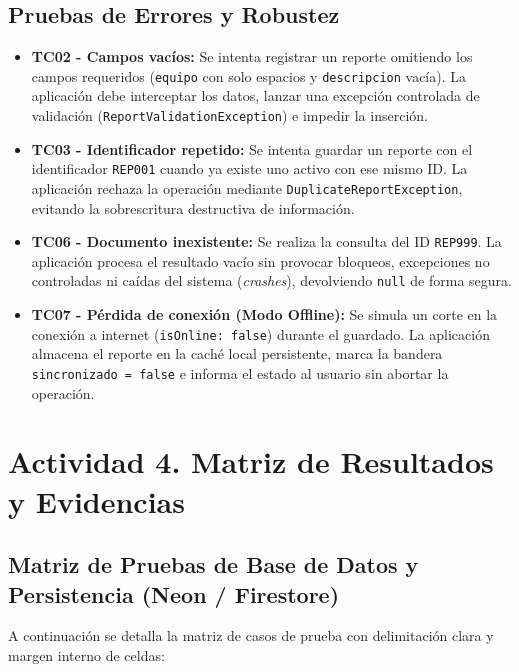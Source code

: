 \documentclass[11pt,a4paper]{article}
\begin{document}
\subsection{Pruebas de Errores y Robustez}
\begin{itemize}
    \item \textbf{TC02 - Campos vacíos:} Se intenta registrar un reporte omitiendo los campos requeridos (\texttt{equipo} con solo espacios y \texttt{descripcion} vacía). La aplicación debe interceptar los datos, lanzar una excepción controlada de validación (\texttt{ReportValidationException}) e impedir la inserción.
    \item \textbf{TC03 - Identificador repetido:} Se intenta guardar un reporte con el identificador \texttt{REP001} cuando ya existe uno activo con ese mismo ID. La aplicación rechaza la operación mediante \texttt{DuplicateReportException}, evitando la sobrescritura destructiva de información.
    \item \textbf{TC06 - Documento inexistente:} Se realiza la consulta del ID \texttt{REP999}. La aplicación procesa el resultado vacío sin provocar bloqueos, excepciones no controladas ni caídas del sistema (\textit{crashes}), devolviendo \texttt{null} de forma segura.
    \item \textbf{TC07 - Pérdida de conexión (Modo Offline):} Se simula un corte en la conexión a internet (\texttt{isOnline: false}) durante el guardado. La aplicación almacena el reporte en la caché local persistente, marca la bandera \texttt{sincronizado = false} e informa el estado al usuario sin abortar la operación.
\end{itemize}

\clearpage
\section{Actividad 4. Matriz de Resultados y Evidencias}

\subsection{Matriz de Pruebas de Base de Datos y Persistencia (Neon / Firestore)}

A continuación se detalla la matriz de casos de prueba con delimitación clara y margen interno de celdas:
\end{document}
